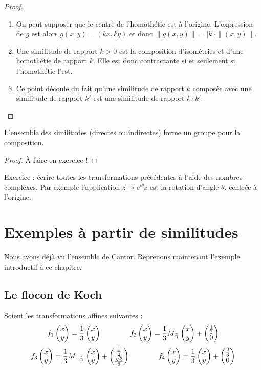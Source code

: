 \documentclass[11pt,class=report,crop=false]{standalone}
\begin{document}
\begin{proof}
\begin{enumerate}
 \item On peut supposer que le centre de l'homothétie est à l'origine. 
L'expression de $g$ est alors $g(x,y)=(kx,ky)$ et donc 
$\|g(x,y) \| = |k| \cdot  \|(x,y)\|.$

 \item Une similitude de rapport $k > 0$ est la composition d'isométries et d'une 
homothétie de rapport $k$. Elle est donc contractante si et seulement si l'homothétie l'est.

 \item Ce point découle du fait qu'une similitude de rapport $k$ composée avec une similitude de rapport $k'$ est une similitude de rapport $k\cdot k'$. 
\end{enumerate}
\end{proof}




\begin{proposition}
L'ensemble des similitudes (directes ou indirectes) forme un groupe pour la composition.
\end{proposition}

\begin{proof}
\`A faire en exercice !
\end{proof}

Exercice : écrire toutes les transformations précédentes à l'aide des nombres complexes.
Par exemple l'application $z \mapsto e^{\ii \theta} z$ est la rotation d'angle 
$\theta$, centrée à l'origine. 


\section{Exemples à partir de similitudes}

Nous avons déjà vu l'ensemble de Cantor. 
Reprenons maintenant l'exemple introductif à ce chapitre.


\subsection{Le flocon de Koch}


Soient les transformations affines suivantes :
$$f_1 \begin{pmatrix}x \\ y\end{pmatrix} = \frac13 \begin{pmatrix}x \\ y\end{pmatrix} \qquad \qquad
f_2\begin{pmatrix}x \\ y\end{pmatrix} = \frac13 M_{\frac \pi 3} \begin{pmatrix}x \\ y\end{pmatrix}+ \begin{pmatrix}\frac13 \\ 0\end{pmatrix}$$
$$f_3\begin{pmatrix}x \\ y\end{pmatrix} = \frac13 M_{-\frac \pi 3}\begin{pmatrix}x \\ y\end{pmatrix}+ \begin{pmatrix}\frac12 \\ \frac{\sqrt 3}{6}\end{pmatrix} \qquad \qquad
f_4\begin{pmatrix}x \\ y\end{pmatrix} = \frac13 \begin{pmatrix}x \\ y\end{pmatrix}+ \begin{pmatrix}\frac23 \\ 0\end{pmatrix}$$
\end{document}
